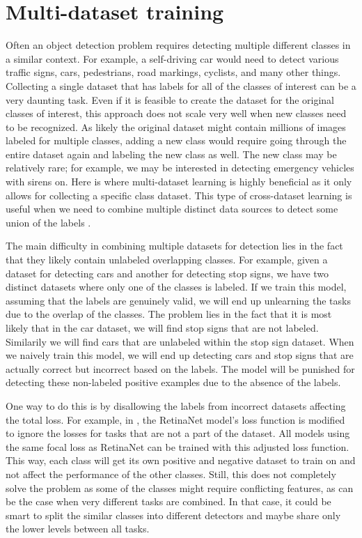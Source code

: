 \section{Multi-dataset training}
Often an object detection problem requires detecting multiple different classes in a similar context.
For example, a self-driving car would need to detect various traffic signs, cars, pedestrians, road markings, cyclists, and many other things.
Collecting a single dataset that has labels for all of the classes of interest can be a very daunting task.
Even if it is feasible to create the dataset for the original classes of interest, this approach does not scale very well when new classes need to be recognized.
As likely the original dataset might contain millions of images labeled for multiple classes, adding a new class would require going through the entire dataset again and labeling the new class as well.
The new class may be relatively rare; for example, we may be interested in detecting emergency vehicles with sirens on.
Here is where multi-dataset learning is highly beneficial as it only allows for collecting a specific class dataset.
This type of cross-dataset learning is useful when we need to combine multiple distinct data sources to detect some union of the labels \citep{cross_data}.

The main difficulty in combining multiple datasets for detection lies in the fact that they likely contain unlabeled overlapping classes.
For example, given a dataset for detecting cars and another for detecting stop signs, we have two distinct datasets where only one of the classes is labeled.
If we train this model, assuming that the labels are genuinely valid, we will end up unlearning the tasks due to the overlap of the classes.
The problem lies in the fact that it is most likely that in the car dataset, we will find stop signs that are not labeled.
Similarily we will find cars that are unlabeled within the stop sign dataset.
When we naively train this model, we will end up detecting cars and stop signs that are actually correct but incorrect based on the labels.
The model will be punished for detecting these non-labeled positive examples due to the absence of the labels.

One way to do this is by disallowing the labels from incorrect datasets affecting the total loss.
For example, in \citep{cross_data}, the RetinaNet \citep{retinaNet} model's loss function is modified to ignore the losses for tasks that are not a part of the dataset.
All models using the same focal loss as RetinaNet can be trained with this adjusted loss function.
This way, each class will get its own positive and negative dataset to train on and not affect the performance of the other classes.
Still, this does not completely solve the problem as some of the classes might require conflicting features, as can be the case when very different tasks are combined. 
In that case, it could be smart to split the similar classes into different detectors and maybe share only the lower levels between all tasks.

